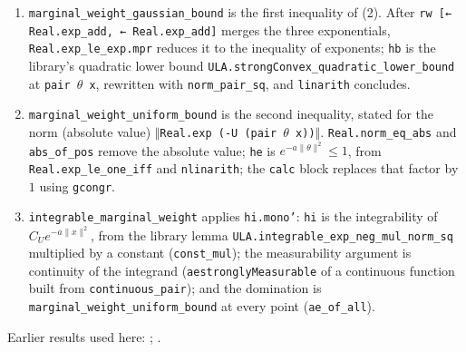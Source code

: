 \documentclass[11pt,a4paper]{report}
\begin{document}
\begin{leanbox}
\begin{enumerate}


\item \texttt{marginal\_\allowbreak{}weight\_\allowbreak{}gaussian\_\allowbreak{}bound} is the first inequality of (2). After \texttt{rw [← Real.\allowbreak{}exp\_\allowbreak{}add, ← Real.\allowbreak{}exp\_\allowbreak{}add]} merges the three exponentials, \texttt{Real.\allowbreak{}exp\_\allowbreak{}le\_\allowbreak{}exp.\allowbreak{}mpr} reduces it to the inequality of exponents; \texttt{hb} is the library's quadratic lower bound \texttt{ULA.\allowbreak{}strong\allowbreak{}Convex\_\allowbreak{}quadratic\_\allowbreak{}lower\_\allowbreak{}bound} at \texttt{pair \ensuremath{\theta} x}, rewritten with \texttt{norm\_\allowbreak{}pair\_\allowbreak{}sq}, and \texttt{linarith} concludes.

\item \texttt{marginal\_\allowbreak{}weight\_\allowbreak{}uniform\_\allowbreak{}bound} is the second inequality, stated for the norm (absolute value) \texttt{\ensuremath{\Vert}Real.\allowbreak{}exp (-\allowbreak{}U (pair \ensuremath{\theta} x))\ensuremath{\Vert}}. \texttt{Real.\allowbreak{}norm\_\allowbreak{}eq\_\allowbreak{}abs} and \texttt{abs\_\allowbreak{}of\_\allowbreak{}pos} remove the absolute value; \texttt{he} is \(e^{-a\|\theta\|^2}\le1\), from \texttt{Real.\allowbreak{}exp\_\allowbreak{}le\_\allowbreak{}one\_\allowbreak{}iff} and \texttt{nlinarith}; the \texttt{calc} block replaces that factor by \(1\) using \texttt{gcongr}.

\item \texttt{integrable\_\allowbreak{}marginal\_\allowbreak{}weight} applies \texttt{hi.\allowbreak{}mono'}: \texttt{hi} is the integrability of \(C_Ue^{-a\|x\|^2}\), from the library lemma \texttt{ULA.\allowbreak{}integrable\_\allowbreak{}exp\_\allowbreak{}neg\_\allowbreak{}mul\_\allowbreak{}norm\_\allowbreak{}sq} multiplied by a constant (\texttt{const\_\allowbreak{}mul}); the measurability argument is continuity of the integrand (\texttt{aestrongly\allowbreak{}Measurable} of a continuous function built from \texttt{continuous\_\allowbreak{}pair}); and the domination is \texttt{marginal\_\allowbreak{}weight\_\allowbreak{}uniform\_\allowbreak{}bound} at every point (\texttt{ae\_\allowbreak{}of\_\allowbreak{}all}).

\end{enumerate}
\end{leanbox}


Earlier results used here: \cite[Section~3.26.4]{LangevinLean2026ULASC}; \cite[Section~3.26.5]{LangevinLean2026ULASC}.
\end{document}
